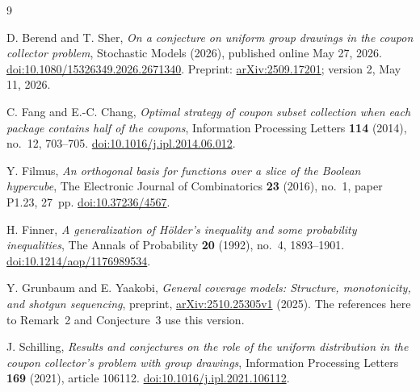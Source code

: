 \documentclass[11pt]{article}
\numberwithin{equation}{section}
\theoremstyle{remark}
\newcommand{\1}{\mathbf 1}
\begin{document}
\begin{thebibliography}{9}
\small
\setlength{\itemsep}{2pt}

D. Berend and T. Sher,
\emph{On a conjecture on uniform group drawings in the coupon collector problem},
Stochastic Models (2026), published online May 27, 2026.
\href{https://doi.org/10.1080/15326349.2026.2671340}{doi:10.1080/15326349.2026.2671340}.
Preprint: \href{https://arxiv.org/abs/2509.17201}{arXiv:2509.17201}; version 2, May 11, 2026.

C. Fang and E.-C. Chang,
\emph{Optimal strategy of coupon subset collection when each package contains half of the coupons},
Information Processing Letters \textbf{114} (2014), no.~12, 703--705.
\href{https://doi.org/10.1016/j.ipl.2014.06.012}{doi:10.1016/j.ipl.2014.06.012}.

Y. Filmus,
\emph{An orthogonal basis for functions over a slice of the Boolean hypercube},
The Electronic Journal of Combinatorics \textbf{23} (2016), no.~1, paper P1.23, 27~pp.
\href{https://doi.org/10.37236/4567}{doi:10.37236/4567}.

H. Finner,
\emph{A generalization of H\"older's inequality and some probability inequalities},
The Annals of Probability \textbf{20} (1992), no.~4, 1893--1901.
\href{https://doi.org/10.1214/aop/1176989534}{doi:10.1214/aop/1176989534}.

Y. Grunbaum and E. Yaakobi,
\emph{General coverage models: Structure, monotonicity, and shotgun sequencing},
preprint, \href{https://arxiv.org/abs/2510.25305v1}{arXiv:2510.25305v1} (2025).
The references here to Remark~2 and Conjecture~3 use this version.

J. Schilling,
\emph{Results and conjectures on the role of the uniform distribution in the coupon collector's problem with group drawings},
Information Processing Letters \textbf{169} (2021), article 106112.
\href{https://doi.org/10.1016/j.ipl.2021.106112}{doi:10.1016/j.ipl.2021.106112}.

\end{thebibliography}
\end{document}
